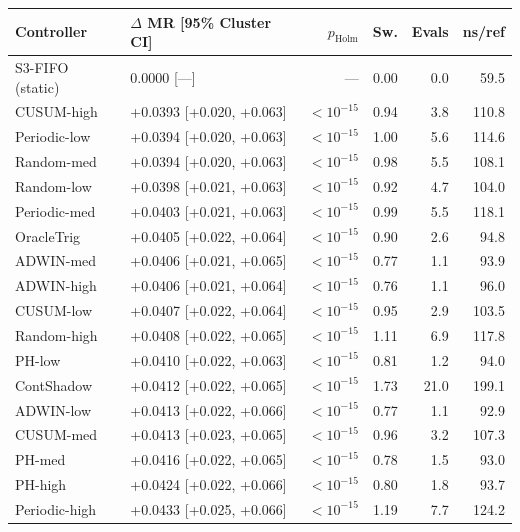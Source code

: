 \begin{tabular}{llrrrr}
\toprule
Controller & $\Delta$ MR [95\% Cluster CI] & $p_{\text{Holm}}$ & Sw. & Evals & ns/ref \\
\midrule
S3-FIFO (static) & 0.0000 [---] & --- & 0.00 & 0.0 & 59.5 \\
\midrule
CUSUM-high & +0.0393 [+0.020, +0.063] & $<10^{-15}$ & 0.94 & 3.8 & 110.8 \\
Periodic-low & +0.0394 [+0.020, +0.063] & $<10^{-15}$ & 1.00 & 5.6 & 114.6 \\
Random-med & +0.0394 [+0.020, +0.063] & $<10^{-15}$ & 0.98 & 5.5 & 108.1 \\
Random-low & +0.0398 [+0.021, +0.063] & $<10^{-15}$ & 0.92 & 4.7 & 104.0 \\
Periodic-med & +0.0403 [+0.021, +0.063] & $<10^{-15}$ & 0.99 & 5.5 & 118.1 \\
OracleTrig & +0.0405 [+0.022, +0.064] & $<10^{-15}$ & 0.90 & 2.6 & 94.8 \\
ADWIN-med & +0.0406 [+0.021, +0.065] & $<10^{-15}$ & 0.77 & 1.1 & 93.9 \\
ADWIN-high & +0.0406 [+0.021, +0.064] & $<10^{-15}$ & 0.76 & 1.1 & 96.0 \\
CUSUM-low & +0.0407 [+0.022, +0.064] & $<10^{-15}$ & 0.95 & 2.9 & 103.5 \\
Random-high & +0.0408 [+0.022, +0.065] & $<10^{-15}$ & 1.11 & 6.9 & 117.8 \\
PH-low & +0.0410 [+0.022, +0.063] & $<10^{-15}$ & 0.81 & 1.2 & 94.0 \\
ContShadow & +0.0412 [+0.022, +0.065] & $<10^{-15}$ & 1.73 & 21.0 & 199.1 \\
ADWIN-low & +0.0413 [+0.022, +0.066] & $<10^{-15}$ & 0.77 & 1.1 & 92.9 \\
CUSUM-med & +0.0413 [+0.023, +0.065] & $<10^{-15}$ & 0.96 & 3.2 & 107.3 \\
PH-med & +0.0416 [+0.022, +0.065] & $<10^{-15}$ & 0.78 & 1.5 & 93.0 \\
PH-high & +0.0424 [+0.022, +0.066] & $<10^{-15}$ & 0.80 & 1.8 & 93.7 \\
Periodic-high & +0.0433 [+0.025, +0.066] & $<10^{-15}$ & 1.19 & 7.7 & 124.2 \\
\bottomrule
\end{tabular}
